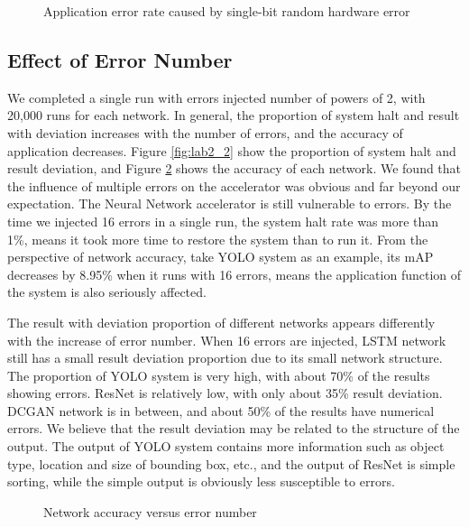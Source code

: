 \begin{figure}
    \caption{Application error rate caused by single-bit random hardware error}
\label{fig:lab1-error-rate}
\vspace{-0.5em}
\end{figure}


\subsection{Effect of Error Number}
We completed a single run with errors injected number of 
powers of 2, with 20,000 runs for each network. In general, 
the proportion of system halt and result with deviation 
increases with the number of errors, and the accuracy of 
application decreases. Figure \ref{fig:lab2_2} show the proportion of 
system halt and result deviation, and Figure \ref{fig:lab2-network-accuracy} shows the 
accuracy of each network. We found that the influence of 
multiple errors on the accelerator was obvious and far 
beyond our expectation. The Neural Network accelerator is 
still vulnerable to errors. By the time we injected 16 
errors in a single run, the system halt rate was more than 
1\%, means it took more time to restore the system than to 
run it. From the perspective of network accuracy, take YOLO 
system as an example, its mAP decreases by 8.95\% when it 
runs with 16 errors, means the application function of the 
system is also seriously affected.

The result with deviation proportion of different networks 
appears differently with the increase of error number. When 
16 errors are injected, LSTM network still has a small 
result deviation proportion due to its small network 
structure. The proportion of YOLO system is very high, with 
about 70\% of the results showing errors. ResNet is 
relatively low, with only about 35\% result deviation. 
DCGAN network is in between, and about 50\% of the results 
have numerical errors. We believe that the result deviation 
may be related to the structure of the output. The output 
of YOLO system contains more information such as object 
type, location and size of bounding box, etc., and the 
output of ResNet is simple sorting, while the simple output 
is obviously less susceptible to errors.

\begin{figure}
    \caption{Network accuracy versus error number}
\label{fig:lab2-network-accuracy}
\vspace{-0.5em}
\end{figure}

